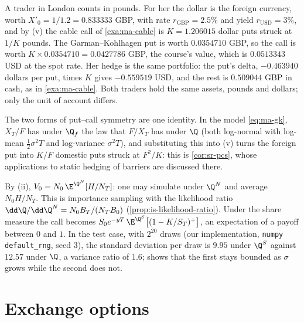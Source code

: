 \begin{example}\label{exa:ma-london}
A trader in London counts in pounds. For her the dollar is the foreign currency, worth
$X'_0=1/1.2=0.833333$ GBP, with rate $r_{\mathrm{GBP}}=2.5\%$ and yield $r_{\mathrm{USD}}=3\%$, and by (v) the cable
call of \cref{exa:ma-cable} is $K=1.206015$ dollar puts struck at $1/K$ pounds. The
Garman--Kohlhagen put is worth $0.0354710$ GBP, so the call is worth $K\times0.0354710=0.0427786$
GBP, the course's value, which is $0.0513343$ USD at the spot rate. Her hedge is the same
portfolio: the put's delta, $-0.463940$ dollars per put, times $K$ gives $-0.559519$ USD, and the
rest is $0.509044$ GBP in cash, as in \cref{exa:ma-cable}. Both traders hold the same assets,
pounds and dollars; only the unit of account differs.
\end{example}

The two forms of put--call symmetry are one identity. In the model \eqref{eq:ma-gk}, $X_T/F$
has under $\Q_f$ the law that $F/X_T$ has under $\Q$ (both log-normal with log-mean
$\frac12\sigma^2T$ and log-variance $\sigma^2T$), and substituting this into (v) turns the foreign put
into $K/F$ domestic puts struck at $F^2/K$: this is \cref{cor:sr-pcs}, whose applications to static
hedging of barriers are discussed there.

\begin{remark}\label{rem:ma-mc-numeraire}
By (ii), $V_0=N_0\,\E^{\Q^N}[H/N_T]$: one may simulate under $\Q^N$ and average $N_0H/N_T$. This
is importance sampling with the likelihood ratio $\dd\Q/\dd\Q^N=N_0B_T/(N_TB_0)$
(\cref{prop:is-likelihood-ratio}). Under the share measure the call becomes
$S_0e^{-yT}\,\E^{\Q^S}\big[(1-K/S_T)^+\big]$, an expectation of a payoff between $0$ and $1$. In
the test case, with $2^{20}$ draws (our implementation, \texttt{numpy} \texttt{default\_rng},
seed $3$), the standard deviation per draw is $9.95$ under $\Q^S$ against $12.57$ under $\Q$, a
variance ratio of $1.6$;  shows that the first stays bounded as $\sigma$ grows while the
second does not.
\end{remark}

\section{Exchange options}\label{sec:ma-exchange}

